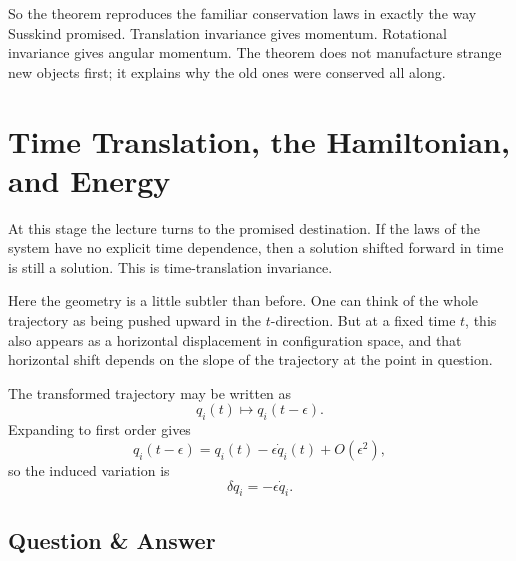 So the theorem reproduces the familiar conservation laws in exactly the way Susskind promised. Translation invariance gives momentum. Rotational invariance gives angular momentum. The theorem does not manufacture strange new objects first; it explains why the old ones were conserved all along.

\section{Time Translation, the Hamiltonian, and Energy}

At this stage the lecture turns to the promised destination. If the laws of the system have no explicit time dependence, then a solution shifted forward in time is still a solution. This is time-translation invariance.

Here the geometry is a little subtler than before. One can think of the whole trajectory as being pushed upward in the \(t\)-direction. But at a fixed time \(t\), this also appears as a horizontal displacement in configuration space, and that horizontal shift depends on the slope of the trajectory at the point in question.

\begin{figure}[h]
\centering
{}
\end{figure}

The transformed trajectory may be written as
\begin{equation}
q_i(t)\mapsto q_i(t-\epsilon).
\end{equation}
Expanding to first order gives
\begin{equation}
q_i(t-\epsilon)=q_i(t)-\epsilon \dot q_i(t)+O(\epsilon^2),
\end{equation}
so the induced variation is
\begin{equation}
\delta q_i=-\epsilon \dot q_i.
\end{equation}

\subsection{Question \& Answer}


